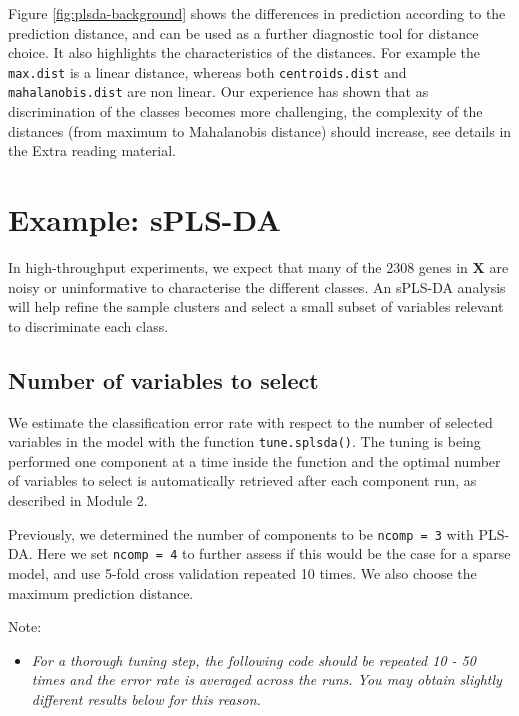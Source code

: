 \documentclass[]{book}
\providecommand{\tightlist}{%
  \setlength{\itemsep}{0pt}\setlength{\parskip}{0pt}}
\begin{document}
Figure \ref{fig:plsda-background} shows the differences in prediction
according to the prediction distance, and can be used as a further
diagnostic tool for distance choice. It also highlights the
characteristics of the distances. For example the \texttt{max.dist} is a
linear distance, whereas both \texttt{centroids.dist} and
\texttt{mahalanobis.dist} are non linear. Our experience has shown that
as discrimination of the classes becomes more challenging, the
complexity of the distances (from maximum to Mahalanobis distance)
should increase, see details in the Extra reading material.

\section{Example: sPLS-DA}\label{ex:splsda}

In high-throughput experiments, we expect that many of the 2308 genes in
\(\boldsymbol X\) are noisy or uninformative to characterise the
different classes. An sPLS-DA analysis will help refine the sample
clusters and select a small subset of variables relevant to discriminate
each class.

\subsection{Number of variables to select}\label{plsda:result:numvar}

We estimate the classification error rate with respect to the number of
selected variables in the model with the function
\texttt{tune.splsda()}. The tuning is being performed one component at a
time inside the function and the optimal number of variables to select
is automatically retrieved after each component run, as described in
Module 2.

Previously, we determined the number of components to be
\texttt{ncomp\ =\ 3} with PLS-DA. Here we set \texttt{ncomp\ =\ 4} to
further assess if this would be the case for a sparse model, and use
5-fold cross validation repeated 10 times. We also choose the maximum
prediction distance.

Note:

\begin{itemize}
\tightlist
\item
  \emph{For a thorough tuning step, the following code should be
  repeated 10 - 50 times and the error rate is averaged across the runs.
  You may obtain slightly different results below for this reason.}
\end{itemize}
\end{document}
